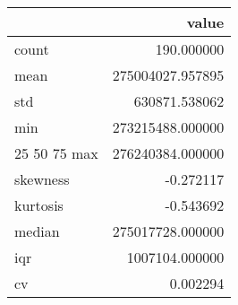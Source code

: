 \begin{tabular}{lr}
\toprule
 & value \\
\midrule
count & 190.000000 \\
mean & 275004027.957895 \\
std & 630871.538062 \\
min & 273215488.000000 \\
25%
50%
75%
max & 276240384.000000 \\
skewness & -0.272117 \\
kurtosis & -0.543692 \\
median & 275017728.000000 \\
iqr & 1007104.000000 \\
cv & 0.002294 \\
\bottomrule
\end{tabular}
